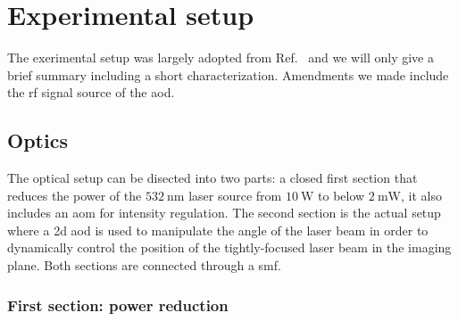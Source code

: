 \chapter{Experimental setup}\label{ch:experimental_setup}

The exerimental setup was largely adopted from Ref.~\cite{Hertlein2017} and we
will only give a brief summary including a short characterization. Amendments
we made include the \gls{rf} signal source of the \gls{aod}.

\section{Optics}

The optical setup can be disected into two parts: a closed first section that
reduces the power of the $\SI{532}{\nano\meter}$ laser source from
$\SI{10}{\watt}$ to below $\SI{2}{\milli\watt}$, it also includes an \gls{aom}
for intensity regulation. The second section is the actual setup where a
\gls{2d} \gls{aod} is used to manipulate the angle of the laser beam in order
to dynamically control the position of the tightly-focused laser beam in the
imaging plane. Both sections are connected through a \gls{smf}.

\subsection{First section: power reduction}\label{subsec:setup_power_reduction}


